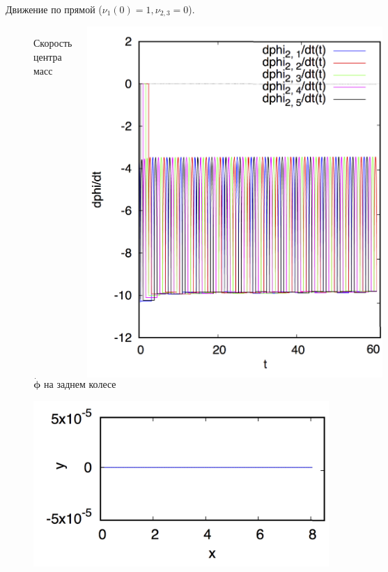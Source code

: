 \documentclass{beamer}
\begin{document}
\begin{frame}{Движение по прямой ($\nu_1(0) = 1, \nu_{2,3} = 0$).}
\begin{figure}[H]
\begin{columns}
                \vspace{-15pt}
                \caption{Скорость центра масс}
                \centering
                \vspace{2.5pt}
                \includegraphics[width=0.8\linewidth]{content/pic/straight_60/nus2.png}
                \vspace{-15pt}
                \caption{$\dot{\mathbf{\phi}}$ на заднем колесе}
        \end{columns}
    \end{figure}
    \vspace{-25pt}
    \begin{figure}[H]
        \centering
        \begin{columns}
                \centering
                \includegraphics[width=\linewidth]{content/pic/straight_60/traj.png}

\end{columns}
\end{figure}
\end{frame}
\end{document}
